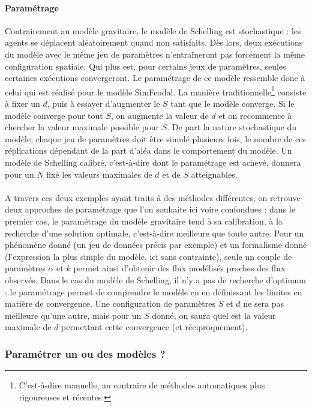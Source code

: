 \documentclass[12pt, a4paper, oneside]{book}
\begin{document}
	\paragraph{Paramétrage}Contrairement au modèle gravitaire, le modèle de Schelling est stochastique : les agents se déplacent aléatoirement quand non satisfaits. Dès lors, deux exécutions du modèle avec le même jeu de paramètres n’entraîneront pas forcément la même configuration spatiale. Qui plus est, pour certains jeux de paramètres, seules certaines exécutions convergeront. Le paramétrage de ce modèle ressemble donc à celui qui est réalisé pour le modèle SimFeodal. La manière \og traditionnelle\fg{}\footnote{C'est-à-dire manuelle, au contraire de méthodes automatiques plus rigoureuses et récentes.} consiste à fixer un $d$, puis à essayer d'augmenter le $S$ tant que le modèle converge. Si le modèle converge pour tout $S$, on augmente la valeur de $d$ et on recommence à chercher la valeur maximale possible pour $S$. De part la nature stochastique du modèle, chaque jeu de paramètres doit être simulé plusieurs fois, le nombre de ces réplications dépendant de la part d'aléa dans le comportement du modèle.
	Un modèle de Schelling calibré, c'est-à-dire dont le paramétrage est achevé,
	donnera pour un $N$ fixé les valeurs maximales de $d$ et de $S$ atteignables.
	
	\paragraph{}A travers ces deux exemples ayant traits à des méthodes différentes, on retrouve deux approches de paramétrage que l'on souhaite ici voire confondues : dans le premier cas, le paramétrage du modèle gravitaire tend à sa calibration, à la recherche d'une solution optimale, c'est-à-dire meilleure que toute autre. Pour un phénomène donné (un jeu de données précis par exemple) et un formalisme donné (l'expression la plus simple du modèle, ici sans contrainte), seule un couple de paramètres $\alpha$ et $k$ permet ainsi d'obtenir des flux modélisés proches des flux observés.
	Dans le cas du modèle de Schelling, il n'y a pas de recherche d'optimum : le paramétrage permet de comprendre le modèle en en définissant les limites en matière de convergence. Une configuration de paramètres $S$ et $d$ ne sera pas meilleure qu'une autre, mais pour un $S$ donné, on saura quel est la valeur maximale de $d$ permettant cette convergence (et réciproquement).
	
	\subsubsection{Paramétrer un ou des modèles ?}
	
\end{document}
